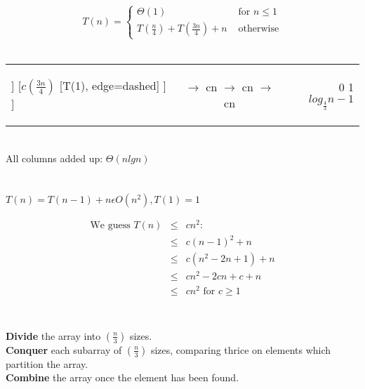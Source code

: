 \documentclass{report}
\begin{document}
\newpage
\section{}
$$
T(n) = \left\{ \begin{array}{ll}
    \Theta(1) &\mbox{ for $n \leq 1$} \\
    T\left(\frac{n}{4}\right) + T\left(\frac{3n}{4}\right) + n &\mbox{ otherwise}
  \end{array} \right.
$$
\\[10mm]
\begin{tabular}{l c r}
  \begin{forest}
  [cn
    [$c\left(\frac{n}{4}\right)$
      [, edge=dashed]
      [, edge=dashed]
    ]
    [$c\left(\frac{3n}{4}\right)$
      [T(1), edge=dashed]
    ]
  ]
\end{forest}
&
\shortstack{$\rightarrow$ cn \\[7mm] $\rightarrow$ cn \\[8mm] $\rightarrow$ cn\\[1mm]}
&
\shortstack{0 \\[6mm] 1 \\[6mm] $log_{\frac{4}{3}}n - 1$\\[0mm]}
\end{tabular}
\\[3mm]
All columns added up: $\Theta(nlg n)$
\\[20mm]
\section{}
$T(n) = T(n - 1) + n \epsilon O\left(n^2\right), T(1) = 1$

\begin{eqnarray*}
  \text{We guess } T(n) &\leq& cn^2: \\
                        &\leq& c(n-1)^2 + n \\
                        &\leq& c(n^2 - 2n + 1) + n \\
                        &\leq& cn^2 - 2cn + c + n \\
                        &\leq& cn^2 \text{ for } c \geq 1 \\
\end{eqnarray*}
\newpage
\section{}
\subsection{}
\textbf{Divide} the array into $\left(\frac{n}{3}\right)$ sizes. \\
\textbf{Conquer} each subarray of $\left(\frac{n}{3}\right)$ sizes, comparing thrice on elements which partition the array.\\
\textbf{Combine} the array once the element has been found. \\
\end{document}
